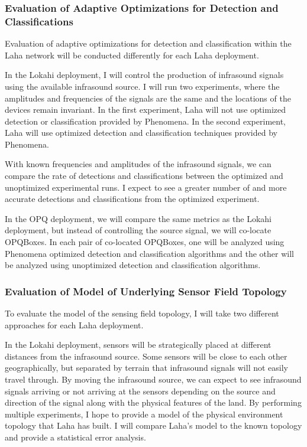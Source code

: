 \subsubsection{Evaluation of Adaptive Optimizations for Detection and Classifications}
Evaluation of adaptive optimizations for detection and classification within the Laha network will be conducted differently for each Laha deployment.

In the Lokahi deployment, I will control the production of infrasound signals using the available infrasound source. I will run two experiments, where the amplitudes and frequencies of the signals are the same and the locations of the devices remain invariant. In the first experiment, Laha will not use optimized detection or classification provided by Phenomena. In the second experiment, Laha will use optimized detection and classification techniques provided by Phenomena. 

With known frequencies and amplitudes of the infrasound signals, we can compare the rate of detections and classifications between the optimized and unoptimized experimental runs. I expect to see a greater number of and more accurate detections and classifications from the optimized experiment.

In the OPQ deployment, we will compare the same metrics as the Lokahi deployment, but instead of controlling the source signal, we will co-locate OPQBoxes. In each pair of co-located OPQBoxes, one will be analyzed using Phenomena optimized detection and classification algorithms and the other will be analyzed using unoptimized detection and classification algorithms.

\subsubsection{Evaluation of Model of Underlying Sensor Field Topology}
To evaluate the model of the sensing field topology, I will take two different approaches for each Laha deployment.

In the Lokahi deployment, sensors will be strategically placed at different distances from the infrasound source. Some sensors will be close to each other geographically, but separated by terrain that infrasound signals will not easily travel through. By moving the infrasound source, we can expect to see infrasound signals arriving or not arriving at the sensors depending on the source and direction of the signal along with the physical features of the land. By performing multiple experiments, I hope to provide a model of the physical environment topology that Laha has built. I will compare Laha's model to the known topology and provide a statistical error analysis. 

